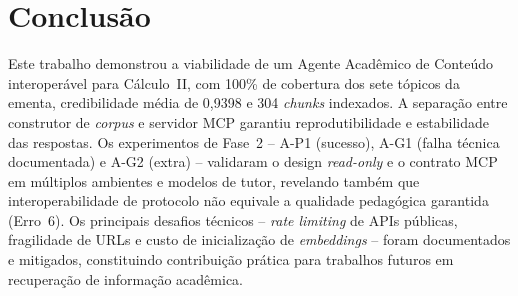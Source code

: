 \documentclass[12pt]{article}
\begin{document}
\section{Conclusão}

Este trabalho demonstrou a viabilidade de um Agente Acadêmico de Conteúdo interoperável para
Cálculo~II, com 100\% de cobertura dos sete tópicos da ementa, credibilidade média de 0,9398 e 304
\textit{chunks} indexados. A separação entre construtor de \textit{corpus} e servidor MCP garantiu
reprodutibilidade e estabilidade das respostas. Os experimentos de Fase~2 -- A-P1 (sucesso), A-G1
(falha técnica documentada) e A-G2 (extra) -- validaram o design \textit{read-only} e o contrato
MCP em múltiplos ambientes e modelos de tutor, revelando também que interoperabilidade de
protocolo não equivale a qualidade pedagógica garantida (Erro~6). Os principais desafios técnicos
-- \textit{rate limiting} de APIs públicas, fragilidade de URLs e custo de inicialização de
\textit{embeddings} -- foram documentados e mitigados, constituindo contribuição prática para
trabalhos futuros em recuperação de informação acadêmica.
\end{document}

